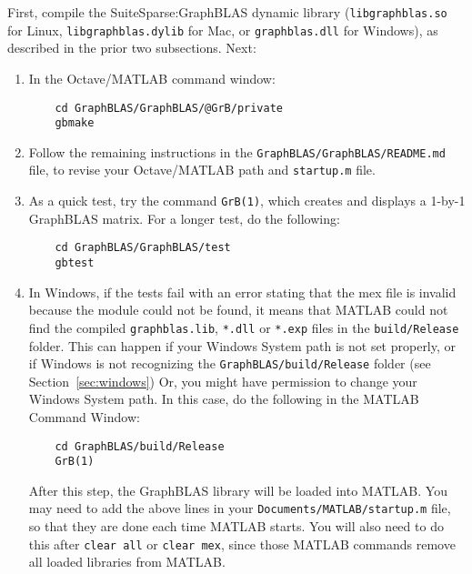 \documentclass[12pt]{article}
\begin{document}
First, compile the SuiteSparse:GraphBLAS dynamic library
(\verb'libgraphblas.so' for Linux, \verb'libgraphblas.dylib' for Mac,
or \verb'graphblas.dll' for Windows), as described in the prior two
subsections.  Next:

\begin{enumerate}
\item In the Octave/MATLAB command window:

    {\small
    \begin{verbatim}
    cd GraphBLAS/GraphBLAS/@GrB/private
    gbmake \end{verbatim} }

\item Follow the remaining instructions in the
    \verb'GraphBLAS/GraphBLAS/README.md' file, to revise your
    Octave/MATLAB path and \verb'startup.m' file.

\item As a quick test, try the command \verb'GrB(1)', which
    creates and displays a 1-by-1 GraphBLAS matrix.  For a longer test, do the
    following:

    {\small
    \begin{verbatim}
    cd GraphBLAS/GraphBLAS/test
    gbtest \end{verbatim} }

\item In Windows, if the tests fail with an error stating that the
    mex file is invalid because the module could not be found, it means
    that MATLAB could not find the compiled \verb'graphblas.lib', \verb'*.dll'
    or \verb'*.exp' files in the \verb'build/Release' folder.  This can happen
    if your Windows System path is not set properly, or if Windows is not
    recognizing the \verb'GraphBLAS/build/Release' folder (see
    Section~\ref{sec:windows})  Or, you might have permission to change your
    Windows System path.  In this case, do the following in the MATLAB Command
    \vspace{-0.1in}
    Window:

    \vspace{-0.1in}
    {\small
    \begin{verbatim}
    cd GraphBLAS/build/Release
    GrB(1) \end{verbatim} }

    \vspace{-0.1in}
    After this step, the GraphBLAS library will be loaded into MATLAB.  You may
    need to add the above lines in your \verb'Documents/MATLAB/startup.m' file,
    so that they are done each time MATLAB starts.  You will also need to do
    this after \verb'clear all' or \verb'clear mex', since those MATLAB
    commands remove all loaded libraries from MATLAB.


\end{enumerate}
\end{document}
